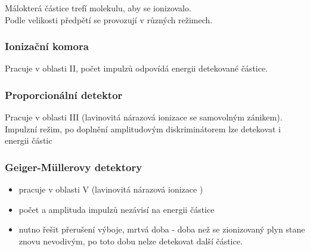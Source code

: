 Málokterá částice trefí molekulu, aby se ionizovalo.\\
Podle velikosti předpětí se provozují v různých režimech.\\

\subsubsection*{Ionizační komora}
Pracuje v oblasti II, počet impulzů odpovídá energii detekované částice.

\subsubsection*{Proporcionální detektor}
Pracuje v oblasti III (lavinovitá nárazová ionizace se
samovolným zánikem).
Impulzní režim, po doplnění amplitudovým diskriminátorem
lze detekovat i energii částic

\subsubsection*{ Geiger-Müllerovy detektory}
\begin{itemize}
    \item  pracuje v oblasti V (lavinovitá nárazová ionizace )
    \item  počet a amplituda impulzů nezávisí na energii částice
    \item  nutno řešit přerušení výboje, mrtvá doba - doba než se zionizovaný plyn stane znovu nevodivým, po toto dobu nelze detekovat další částice.

\end{itemize}


